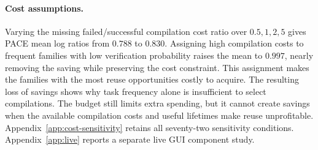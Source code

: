 \paragraph{Cost assumptions.}
Varying the missing failed/successful compilation cost ratio over $0.5,1,2,5$ gives PACE mean log ratios from $0.788$ to $0.830$.
Assigning high compilation costs to frequent families with low verification probability raises the mean to $0.997$, nearly removing the saving while preserving the cost constraint.
This assignment makes the families with the most reuse opportunities costly to acquire.
The resulting loss of savings shows why task frequency alone is insufficient to select compilations.
The budget still limits extra spending, but it cannot create savings when the available compilation costs and useful lifetimes make reuse unprofitable.
Appendix~\ref{app:cost-sensitivity} retains all seventy-two sensitivity conditions.
Appendix~\ref{app:live} reports a separate live GUI component study.
